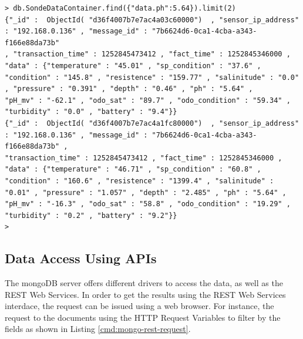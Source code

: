 \lstset{label=cmd:mongo-find-limit,caption=Query Element with specific
projection limiting the result set size}
\begin{lstlisting}
> db.SondeDataContainer.find({"data.ph":5.64}).limit(2)
{"_id" :  ObjectId( "d36f4007b7e7ac4a03c60000")  , "sensor_ip_address" : "192.168.0.136" , "message_id" : "7b6624d6-0ca1-4cba-a343-f166e88da73b"
, "transaction_time" : 1252845473412 , "fact_time" : 1252845346000 , "data" : {"temperature" : "45.01" , "sp_condition" : "37.6" ,
"condition" : "145.8" , "resistence" : "159.77" , "salinitude" : "0.0" , "pressure" : "0.391" , "depth" : "0.46" , "ph" : "5.64" ,
"pH_mv" : "-62.1" , "odo_sat" : "89.7" , "odo_condition" : "59.34" , "turbidity" : "0.0" , "battery" : "9.4"}}
{"_id" :  ObjectId( "d36f4007b7e7ac4a1fc80000")  , "sensor_ip_address" : "192.168.0.136" , "message_id" : "7b6624d6-0ca1-4cba-a343-f166e88da73b" ,
"transaction_time" : 1252845473412 , "fact_time" : 1252845346000 , "data" : {"temperature" : "46.71" , "sp_condition" : "60.8" ,
"condition" : "160.6" , "resistence" : "1399.4" , "salinitude" : "0.01" , "pressure" : "1.057" , "depth" : "2.485" , "ph" : "5.64" ,
"pH_mv" : "-16.3" , "odo_sat" : "58.8" , "odo_condition" : "19.29" , "turbidity" : "0.2" , "battery" : "9.2"}}
>
\end{lstlisting}

\subsection{Data Access Using APIs}
\label{sec:dsp-mongodb-rest-ws}

The mongoDB server offers different drivers to access the data, as well as the
REST Web Services. In order to get the results using the REST Web Services
interdace, the request can be issued using a web browser. For instance, the
request to the documents using the HTTP Request Variables to filter by the
fields as shown in Listing \ref{cmd:mongo-rest-request}.

